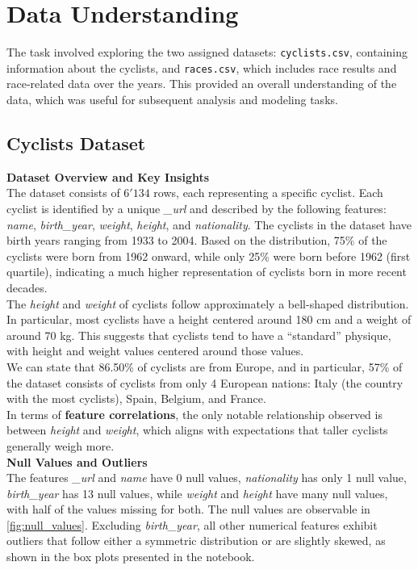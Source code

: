 \section{Data Understanding}

The task involved exploring the two assigned datasets: \texttt{cyclists.csv}, containing information about the cyclists, and \texttt{races.csv}, which includes race results and race-related data over the years. This provided an overall understanding of the data, which was useful for subsequent analysis and modeling tasks.

\subsection{Cyclists Dataset}
\textbf{Dataset Overview and Key Insights}\\
The dataset consists of $6'134$ rows, each representing a specific cyclist. Each cyclist is identified by a unique \textit{\_url} and described by the following features: \textit{name}, \textit{birth\_year}, \textit{weight}, \textit{height}, and \textit{nationality}. The cyclists in the dataset have birth years ranging from 1933 to 2004. Based on the distribution, 75\% of the cyclists were born from 1962 onward, while only 25\% were born before 1962 (first quartile), indicating a much higher representation of cyclists born in more recent decades. \\
The \textit{height} and \textit{weight} of cyclists follow approximately a bell-shaped distribution. In particular, most cyclists have a height centered around 180 cm and a weight of around 70 kg. This suggests that cyclists tend to have a “standard” physique, with height and weight values centered around those values. \\
We can state that 86.50\% of cyclists are from Europe, and in particular, 57\% of the dataset consists of cyclists from only 4 European nations: Italy (the country with the most cyclists), Spain, Belgium, and France.\\
In terms of \textbf{feature correlations}, the only notable relationship observed is between \textit{height} and \textit{weight}, which aligns with expectations that taller cyclists generally weigh more.\\

\noindent
\textbf{Null Values and Outliers}\\  
The features \textit{\_url} and \textit{name} have 0 null values, \textit{nationality} has only 1 null value, \textit{birth\_year} has 13 null values, while \textit{weight} and \textit{height} have many null values, with half of the values missing for both. The null values are observable in \autoref{fig:null_values}. Excluding \textit{birth\_year}, all other numerical features exhibit outliers that follow either a symmetric distribution or are slightly skewed, as shown in the box plots presented in the notebook.\\


